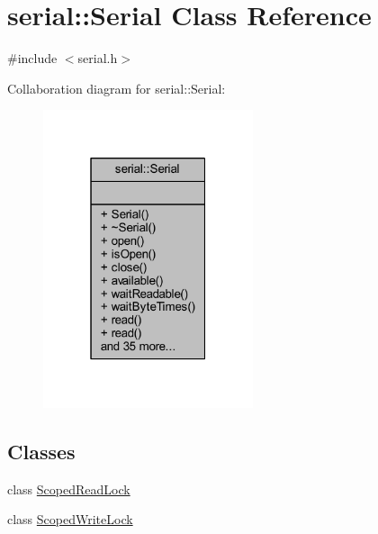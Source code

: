 \hypertarget{classserial_1_1_serial}{}\section{serial\+:\+:Serial Class Reference}
\label{classserial_1_1_serial}


{\ttfamily \#include $<$serial.\+h$>$}



Collaboration diagram for serial\+:\+:Serial\+:\nopagebreak
\begin{figure}[H]
\begin{center}
\leavevmode
\includegraphics[width=175pt]{classserial_1_1_serial__coll__graph}
\end{center}
\end{figure}
\subsection*{Classes}
\begin{DoxyCompactItemize}
\item 
class \mbox{\hyperlink{class_serial_1_1_scoped_read_lock}{Scoped\+Read\+Lock}}
\item 
class \mbox{\hyperlink{class_serial_1_1_scoped_write_lock}{Scoped\+Write\+Lock}}
\end{DoxyCompactItemize}
